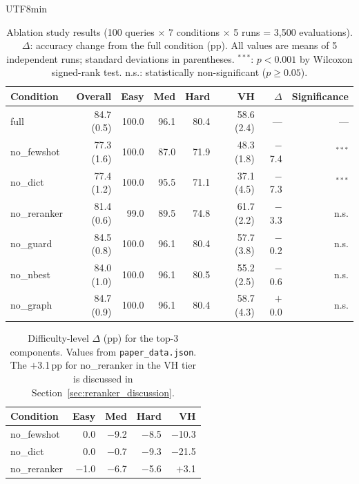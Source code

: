 \documentclass[sn-mathphys,Numbered]{sn-jnl}
\begin{document}
\begin{CJK}{UTF8}{min}
\begin{table}[t]
\centering
\caption{Ablation study results (100 queries $\times$ 7 conditions
$\times$ 5 runs = 3{,}500 evaluations).
$\Delta$: accuracy change from the full condition (pp).
All values are means of 5 independent runs; standard deviations
in parentheses.
$^{***}$: $p<0.001$ by Wilcoxon signed-rank test.
n.s.: statistically non-significant ($p\geq 0.05$).}
\label{tab:ablation}
\small
\begin{tabular}{@{}lrrrrrrr@{}}
\toprule
Condition & Overall & Easy & Med & Hard & VH & $\Delta$ & Significance \\
\midrule
full          & 84.7 (0.5) & 100.0 & 96.1 & 80.4 & 58.6 (2.4) & ---    & --- \\
no\_fewshot   & 77.3 (1.6) & 100.0 & 87.0 & 71.9 & 48.3 (1.8) & $-$7.4  & $^{***}$ \\
no\_dict      & 77.4 (1.2) & 100.0 & 95.5 & 71.1 & 37.1 (4.5) & $-$7.3  & $^{***}$ \\
no\_reranker  & 81.4 (0.6) & 99.0 & 89.5 & 74.8 & 61.7 (2.2) & $-$3.3  & n.s. \\
no\_guard     & 84.5 (0.8) & 100.0 & 96.1 & 80.4 & 57.7 (3.8) & $-$0.2  & n.s. \\
no\_nbest     & 84.0 (1.0) & 100.0 & 96.1 & 80.5 & 55.2 (2.5) & $-$0.6  & n.s. \\
no\_graph     & 84.7 (0.9) & 100.0 & 96.1 & 80.4 & 58.7 (4.3) & $+$0.0  & n.s. \\
\bottomrule
\end{tabular}
\end{table}

\begin{table}[t]
\centering
\caption{Difficulty-level $\Delta$ (pp) for the top-3 components.
Values from \texttt{paper\_data.json}.
The $+$3.1\,pp for no\_reranker in the VH tier is discussed in
Section~\ref{sec:reranker_discussion}.}
\label{tab:ablation-detail}
\small
\begin{tabular}{@{}lrrrr@{}}
\toprule
Condition & Easy & Med & Hard & VH \\
\midrule
no\_fewshot   &    0.0  & $-$9.2  & $-$8.5  & $-$10.3 \\
no\_dict      &    0.0  & $-$0.7  & $-$9.3  & $-$21.5 \\
no\_reranker  & $-$1.0  & $-$6.7  & $-$5.6  & $+$3.1  \\
\bottomrule
\end{tabular}
\end{table}


\end{CJK}
\end{document}
